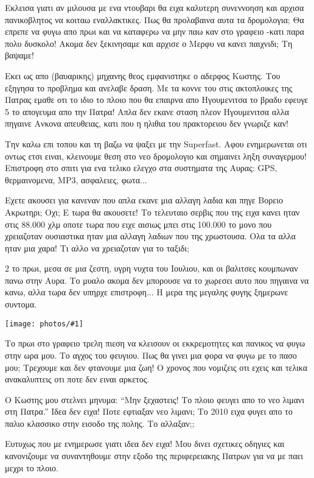 \documentclass[]{book}
\newcommand\photo[1]{\noindent\texttt{[image: photos/\#1]}}
\begin{document}
Εκλεισα γιατι αν μιλουσα με ενα ντουβαρι θα ειχα καλυτερη συνεννοηση και αρχισα πανικοβλητος να κοιταω εναλλακτικες. Πως θα προλαβαινα αυτα τα δρομολογια; Θα επρεπε να φυγω απο πρωι και να καταφερω να μην παω καν στο γραφειο -κατι παρα πολυ δυσκολο! Ακομα δεν ξεκινησαμε και αρχισε ο Μερφυ να κανει παιχνιδι; Τη βαψαμε!

Εκει ως απο (βαυαρικης) μηχανης θεος εμφανιστηκε ο αδερφος Κωστης. Του εξηγησα το προβλημα και ανελαβε δραση. Με τα κοννε του στις ακτοπλοικες της Πατρας εμαθε οτι το ιδιο το πλοιο που θα επαιρνα απο Ηγουμενιτσα το βραδυ εφευγε 5 το απογευμα απο την Πατρα! Απλα δεν εκανε σταση πλεον Ηγουμενιτσα αλλα πηγαινε Ανκονα απευθειας, κατι που η ηλιθια του πρακτορειου δεν γνωριζε καν!

Την καλω επι τοπου και τη βαζω να ψαξει με την Superfast. Αφου ενημερωνεται οτι οντως ετσι ειναι, κλεινουμε θεση στο νεο δρομολογιο και σημαινει ληξη συναγερμου! Επιστροφη στο σπιτι για ενα τελικο ελεγχο στα συστηματα της Αυρας: GPS, θερμαινομενα, MP3, ασφαλειες, φωτα...

Εχετε ακουσει για κανεναν που απλα εκανε μια αλλαγη λαδια και πηγε Βορειο Ακρωτηρι; Οχι; Ε τωρα θα ακουσετε! Το τελευταιο σερβις που της ειχα κανει ηταν στις 88.000 χλμ οποτε τωρα που ειχε αισιως μπει στις 100.000 το μονο που χρειαζοταν ουσιαστικα ηταν μια αλλαγη λαδιων που της χρωστουσα. Ολα τα αλλα ηταν μια χαρα! Τι αλλο να χρειαζοταν για το ταξιδι;

2 το πρωι, μεσα σε μια ζεστη, υγρη νυχτα του Ιουλιου, και οι βαλιτσες κουμπωναν πανω στην Αυρα.
Το μυαλο ακομα δεν μπορουσε να το χωρεσει αυτο που πηγαινα να κανω, αλλα τωρα δεν υπηρχε επιστροφη...
Η μερα της μεγαλης φυγης ξημερωνε συντομα.

\photo{2.jpg}

Το πρωι στο γραφειο τρελη πιεση να κλεισουν οι εκκρεμοτητες και πανικος να φυγω στην ωρα μου. 
Το αγχος του φευγιου. Πως θα γινει μια φορα να φυγω με το πασο μου; Τρεχουμε και δεν φτανουμε μια ζωη! 
Ο χρονος που νομιζεις οτι εχεις και τελικα ανακαλυπτεις οτι ποτε δεν ειναι αρκετος.

Ο Κωστης μου στελνει μηνυμα: ``Μην ξεχαστεις! Το πλοιο φευγει απο το νεο λιμανι στη Πατρα.'' Ιδεα δεν ειχα! Ποτε εφτιαξαν νεο λιμανι; Το 2010 ειχα φυγει απο το παλιο κλασσικο στην εισοδο της πολης. Το αλλαξαν;; 

Ευτυχως που με ενημερωσε γιατι ιδεα δεν ειχα! Μου δινει σχετικες οδηγιες και κανονιζουμε να συναντηθουμε στην εξοδο της περιφερειακης Πατρων για να με παει μεχρι το πλοιο. 
\end{document}
